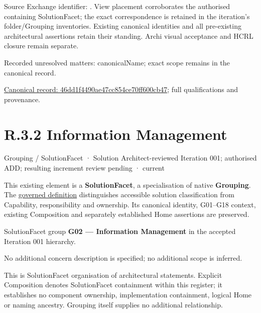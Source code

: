 Source Exchange identifier: \texttt{}. View placement corroborates
the authorised containing SolutionFacet; the exact correspondence is retained in the
iteration's folder/Grouping inventories. Existing canonical identities and all
pre-existing architectural assertions retain their standing. Archi visual
acceptance and HCRL closure remain separate.


{\small Recorded unresolved matters: canonicalName; exact scope remains in the canonical record.}\par
{\footnotesize \href{../../../../../../../continuum/grouping/46dd1f4490ae47cc854ce70ff600cb47.md}{Canonical record: 46dd1f4490ae47cc854ce70ff600cb47}; full qualifications and provenance.}\par
\section*{R.3.2 Information Management}
\label{navigation:R.3.2}

\label{element:ef296738e68e4206a507dc3c811b3fe1}
{\small Grouping / SolutionFacet · Solution Architect-reviewed Iteration 001; authorised ADD; resulting increment review pending · current}\par

This existing element is a \textbf{SolutionFacet}, a specialisation of native
\textbf{Grouping}. The \href{\detokenize{../../../../../../../governance/continuum-representation.md#solutionfacet-classification--1119-candidate}}{governed definition}
distinguishes accessible solution classification from Capability, responsibility
and ownership. Its canonical identity, G01–G18 context, existing Composition
and separately established Home assertions are preserved.



SolutionFacet group \textbf{G02 — Information Management} in the accepted Iteration 001 hierarchy.



No additional concern description is specified; no additional scope is inferred.



This is SolutionFacet organisation of architectural statements. Explicit Composition denotes SolutionFacet containment within this register; it establishes no component ownership, implementation containment, logical Home or naming ancestry. Grouping itself supplies no additional relationship.


